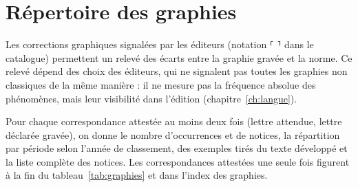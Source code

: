 \chapter{Répertoire des graphies}\label{ch:rep_graphies}

Les corrections graphiques signalées par les éditeurs (notation ⸢~⸣ dans le catalogue) permettent un relevé des écarts entre la graphie gravée et la norme. Ce relevé dépend des choix des éditeurs, qui ne signalent pas toutes les graphies non classiques de la même manière : il ne mesure pas la fréquence absolue des phénomènes, mais leur visibilité dans l’édition (chapitre~\ref{ch:langue}).

Pour chaque correspondance attestée au moins deux fois (lettre attendue, lettre déclarée gravée), on donne le nombre d’occurrences et de notices, la répartition par période selon l’année de classement, des exemples tirés du texte développé et la liste complète des notices. Les correspondances attestées une seule fois figurent à la fin du tableau~\ref{tab:graphies} et dans l’index des graphies.

{\small

}
